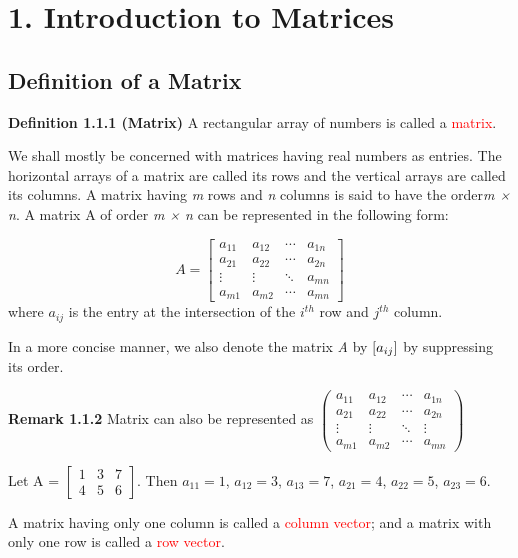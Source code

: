 \documentclass{book}
\begin{document}
\section*{1. Introduction to Matrices}
\subsection*{Definition of a Matrix}
\textbf{Definition 1.1.1 (Matrix)} A rectangular array of numbers is called a \textcolor{red}{matrix}.

\par{We shall mostly be concerned with matrices having real numbers as entries. The horizontal arrays of a matrix are called its rows and the vertical arrays are called its columns. A matrix having \textit{m} rows and \textit{n} columns is said to have the order\textit{m × n}. A matrix A of order \textit{m × n} can be represented in the following form:}


$$A =  \begin{bmatrix}
	a_{11} & a_{12} & \cdots & a_{1n} \\
	a_{21} & a_{22} & \cdots & a_{2n} \\
	\vdots & \vdots & \ddots & a_{mn} \\
	a_{m1} & a_{m2} & \cdots & a_{mn}
\end{bmatrix} $$
where $a_{ij}$ is the entry at the intersection of the $i^{th}$ row and $j^{th}$ column.


In a more concise manner, we also denote the matrix \textit{A} by $\small[a_{ij}\small]$ by suppressing its order.

\textbf{Remark 1.1.2} Matrix can also be represented as $ \begin{pmatrix} 
	a_{11} & a_{12} & \cdots & a_{1n} \\
	a_{21} & a_{22} & \cdots & a_{2n} \\
	\vdots & \vdots & \ddots & \vdots \\
	a_{m1} & a_{m2} & \cdots & a_{mn}
\end{pmatrix}$

Let A = $ \begin{bmatrix} 
	1 & 3 & 7 \\
	4 & 5 & 6 
\end{bmatrix}$. Then $a_{11} = 1$, $a_{12} = 3$, $a_{13} = 7$, $a_{21} = 4$, $a_{22} = 5$, $a_{23} = 6. $


A matrix having only one column is called a \textcolor{red}{column vector}; and a matrix with only one row is called a \textcolor{red}{row vector}.
\end{document}
